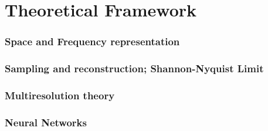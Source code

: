 \chapter{Theoretical Framework}

\subsection{Space and Frequency representation}


\subsection{Sampling and reconstruction; Shannon-Nyquist Limit} 

\subsection{Multiresolution theory}

\subsection{Neural Networks}



